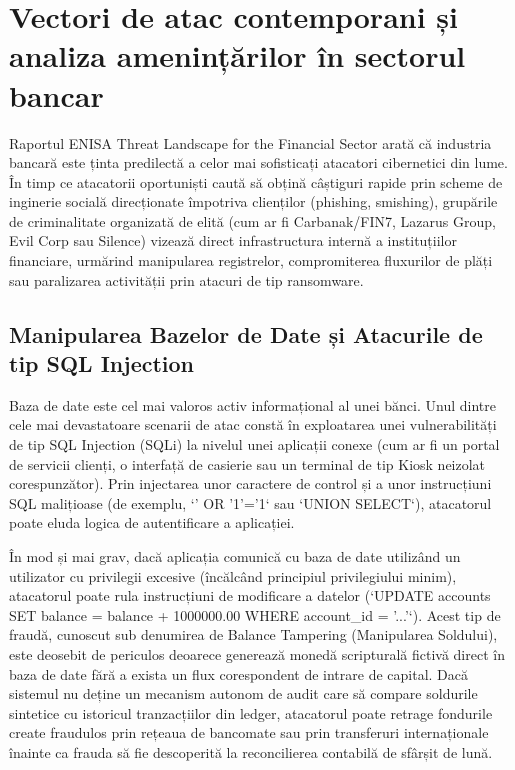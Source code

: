 \section{Vectori de atac contemporani și analiza amenințărilor în sectorul bancar}

Raportul ENISA Threat Landscape for the Financial Sector arată că industria bancară este ținta predilectă a celor mai sofisticați atacatori cibernetici din lume. În timp ce atacatorii oportuniști caută să obțină câștiguri rapide prin scheme de inginerie socială direcționate împotriva clienților (phishing, smishing), grupările de criminalitate organizată de elită (cum ar fi Carbanak/FIN7, Lazarus Group, Evil Corp sau Silence) vizează direct infrastructura internă a instituțiilor financiare, urmărind manipularea registrelor, compromiterea fluxurilor de plăți sau paralizarea activității prin atacuri de tip ransomware.

\subsection{Manipularea Bazelor de Date și Atacurile de tip SQL Injection}

Baza de date este cel mai valoros activ informațional al unei bănci. Unul dintre cele mai devastatoare scenarii de atac constă în exploatarea unei vulnerabilități de tip SQL Injection (SQLi) la nivelul unei aplicații conexe (cum ar fi un portal de servicii clienți, o interfață de casierie sau un terminal de tip Kiosk neizolat corespunzător). Prin injectarea unor caractere de control și a unor instrucțiuni SQL malițioase (de exemplu, `' OR '1'='1` sau `UNION SELECT`), atacatorul poate eluda logica de autentificare a aplicației.

În mod și mai grav, dacă aplicația comunică cu baza de date utilizând un utilizator cu privilegii excesive (încălcând principiul privilegiului minim), atacatorul poate rula instrucțiuni de modificare a datelor (`UPDATE accounts SET balance = balance + 1000000.00 WHERE account\_id = '...'`). Acest tip de fraudă, cunoscut sub denumirea de Balance Tampering (Manipularea Soldului), este deosebit de periculos deoarece generează monedă scripturală fictivă direct în baza de date fără a exista un flux corespondent de intrare de capital. Dacă sistemul nu deține un mecanism autonom de audit care să compare soldurile sintetice cu istoricul tranzacțiilor din ledger, atacatorul poate retrage fondurile create fraudulos prin rețeaua de bancomate sau prin transferuri internaționale înainte ca frauda să fie descoperită la reconcilierea contabilă de sfârșit de lună.

